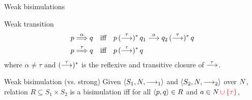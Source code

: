 \documentclass[aspectratio=169]{beamer}
\begin{document}





\begin{slide}{Weak bisimulations}
\small

\medskip
{}

\begin{block}{Weak transition}
\vspace{-6mm}
\begin{align*}
  p \stackrel{\alpha}{\Longrightarrow} q ~~~&\text{iff}~~~
  p \,(\stackrel{\tau}{\longrightarrow})^{*}\, q_1\stackrel{a}{\longrightarrow} q_2 \,(\stackrel{\tau}{\longrightarrow})^{*}\, q
  \\
  p \stackrel{\tau}{\Longrightarrow} q ~~~&\text{iff}~~~
  p \,(\stackrel{\tau}{\longrightarrow})^{*}\, q
\end{align*}  
where $\alpha \neq \tau$ and $(\stackrel{\tau}{\longrightarrow})^{*}$ is the reflexive and transitive closure of $\stackrel{\tau}{\longrightarrow}$.
\end{block}

\begin{block}{Weak bisimulation (vs. strong)}
Given  $\mathopen{\langle}S_1, N,  \longrightarrow_1\mathclose{\rangle}$  and $\mathopen{\langle}S_2, N, \longrightarrow_2\mathclose{\rangle}$ over $N$,
relation $R \subseteq S_1 \times S_2$ is a \alert{bisimulation} iff for all $\mathopen{\langle}p,q\mathclose{\rangle} \in R$ and $a \in N\,\textcolor{red}{\cup \left\{ \tau \right\}}$,


\end{block}
\end{slide}
\end{document}
